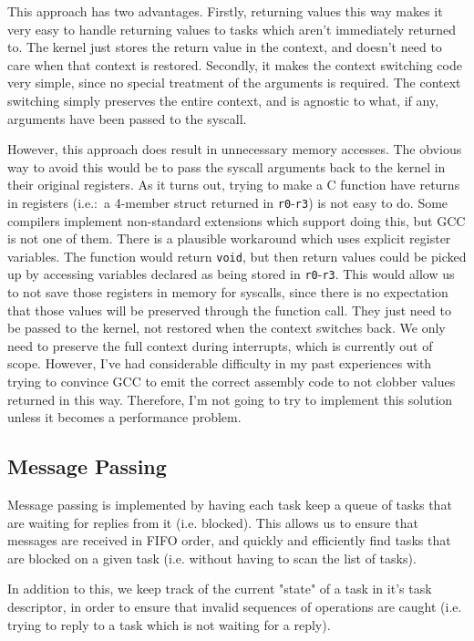 \documentclass[titlepage]{article}
\begin{document}
This approach has two advantages.
Firstly, returning values this way makes it very easy to handle returning values
to tasks which aren't immediately returned to.
The kernel just stores the return value in the context, and doesn't need to care
when that context is restored.
Secondly, it makes the context switching code very simple, since no special treatment
of the arguments is required.
The context switching simply preserves the entire context, and is agnostic to what,
if any, arguments have been passed to the syscall.

However, this approach does result in unnecessary memory accesses.
The obvious way to avoid this would be to pass the syscall arguments back to the kernel
in their original registers.
As it turns out, trying to make a C function have returns in registers (i.e.:\ a 4-member
struct returned in \texttt{r0}-\texttt{r3}) is not easy to do.
Some compilers implement non-standard extensions which support doing this, but GCC
is not one of them.
There is a plausible workaround which uses explicit register variables.
The function would return \texttt{void}, but then return values could be picked up
by accessing variables declared as being stored in \texttt{r0}-\texttt{r3}.
This would allow us to not save those registers in memory for syscalls, since
there is no expectation that those values will be preserved through the function call.
They just need to be passed to the kernel, not restored when the context switches back.
We only need to preserve the full context during interrupts, which is
currently out of scope.
However, I've had considerable difficulty in my past experiences with trying to
convince GCC to emit the correct assembly code to not clobber values returned in this
way.
Therefore, I'm not going to try to implement this solution unless it becomes a
performance problem.

\subsection{Message Passing}
Message passing is implemented by having each task keep a queue
of tasks that are waiting for replies from it (i.e. blocked). This allows us
to ensure that messages are received in FIFO order, and quickly and efficiently
find tasks that are blocked on a given task (i.e. without having to scan the
list of tasks).

In addition to this, we keep track of the current "state" of a task in it's
task descriptor, in order to ensure that invalid sequences of operations are
caught (i.e. trying to reply to a task which is not waiting for a reply).
\end{document}
